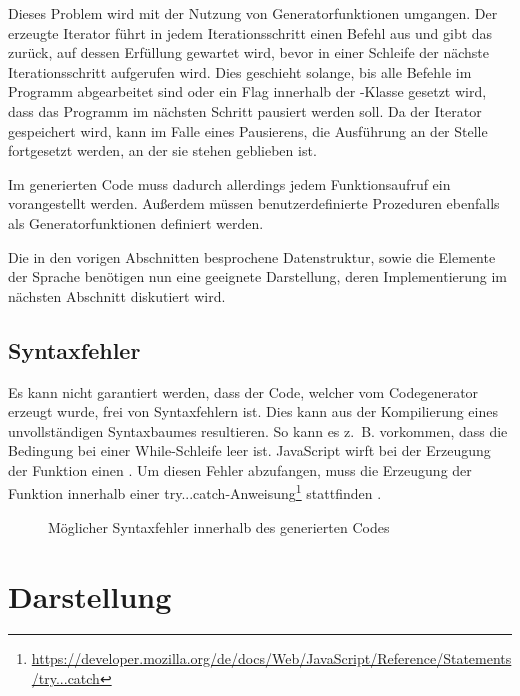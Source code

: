 Dieses Problem wird mit der Nutzung von Generatorfunktionen umgangen. Der erzeugte Iterator führt in jedem Iterationsschritt einen Befehl aus und gibt das  zurück, auf dessen Erfüllung gewartet wird, bevor in einer Schleife der nächste Iterationsschritt aufgerufen wird. Dies geschieht solange, bis alle Befehle im Programm abgearbeitet sind oder ein Flag innerhalb der -Klasse gesetzt wird, dass das Programm im nächsten Schritt pausiert werden soll. Da der Iterator gespeichert wird, kann im Falle eines Pausierens, die Ausführung an der Stelle fortgesetzt werden, an der sie stehen geblieben ist.

Im generierten Code muss dadurch allerdings jedem Funktionsaufruf ein  vorangestellt werden. Außerdem müssen benutzerdefinierte Prozeduren ebenfalls als Generatorfunktionen definiert werden.

Die in den vorigen Abschnitten besprochene Datenstruktur, sowie die Elemente der Sprache benötigen nun eine geeignete Darstellung, deren Implementierung im nächsten Abschnitt diskutiert wird.

\subsection{Syntaxfehler}
\label{sec:implementation:syntax-errors}

Es kann nicht garantiert werden, dass der Code, welcher vom Codegenerator erzeugt wurde, frei von Syntaxfehlern ist. Dies kann aus der Kompilierung eines unvollständigen Syntaxbaumes resultieren. So kann es z.~B. vorkommen, dass die Bedingung bei einer While-Schleife leer ist. JavaScript wirft bei der Erzeugung der Funktion einen . Um diesen Fehler abzufangen, muss die Erzeugung der Funktion innerhalb einer try...catch-Anweisung\footnote{\url{https://developer.mozilla.org/de/docs/Web/JavaScript/Reference/Statements/try...catch}} stattfinden .

\begin{figure}
  
  \caption{Möglicher Syntaxfehler innerhalb des generierten Codes}
  \label{fig:implementation:evaluation:try-catch}
\end{figure}

\section{Darstellung}
\label{sec:implementation:rendering}

